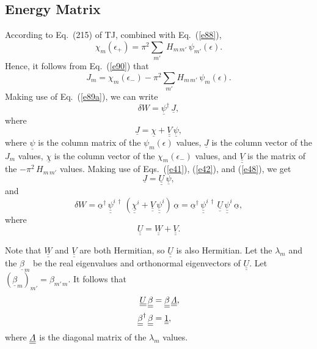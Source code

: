 \documentclass[12pt,prb,aps,notitlepage]{revtex4-1}
\begin{document}
\subsection{Energy Matrix}
According to Eq.~(215) of TJ, combined with Eq.~(\ref{e88}), 
\begin{equation}
\chi_m(\epsilon_+)=\pi^2\sum_{m'}\,H_{m\,m'}\,\psi_{m'}(\epsilon).
\end{equation}
Hence, it follows from Eq.~(\ref{e90}) that
\begin{equation}
J_m = \chi_m(\epsilon_-)-\pi^2\sum_{m'} H_{m\,m'}\,\psi_m(\epsilon).
\end{equation}
Making use of Eq.~(\ref{e89a}), we can write
\begin{equation}
\delta W = \underline{\psi}^\dag\,\underline{J},
\end{equation}
where 
\begin{equation}
\underline{J} = \underline{\chi}+ \underline{\underline{V}}\,\underline{\psi},
\end{equation}
where  $\underline{\psi}$ is the column matrix of the $\psi_m(\epsilon)$ values, $\underline{J}$ is the column vector of the $J_m$ values, $\underline{\chi}$ is the column vector of the $\chi_m(\epsilon_-)$ values,
and $\underline{\underline{V}}$ is the matrix of the $-\pi^2\,H_{m\,m'}$ values. 
Making use of Eqs.~(\ref{e41}), (\ref{e42}), and (\ref{e48}), we get 
\begin{equation}
\underline{J} = \underline{\underline{U}}\,\underline{\psi},
\end{equation}
and
\begin{equation}
\delta W = \underline{\alpha}^\dag\,\underline{\underline{\psi}}^{i\,\dag}\,(\underline{\underline{\chi}}^i + \underline{\underline{V}}\,\underline{\underline{\psi}}^i)\,\underline{\alpha}=  \underline{\alpha}^\dag\,\underline{\underline{\psi}}^{i\,\dag}\,\underline{\underline{U}}\,\underline{\underline{\psi}}^i\,\underline{\alpha},
\end{equation}
where
\begin{equation}
\underline{\underline{U}}=\underline{\underline{W}}+\underline{\underline{V}}.
\end{equation}

Note that $\underline{\underline{W}}$ and $\underline{\underline{V}}$ are both Hermitian, so $\underline{\underline{U}}$ is also
Hermitian. Let 
 the  $\lambda_m$ and the $\underline{\beta}_m$ be the real eigenvalues and orthonormal eigenvectors of $\underline{\underline{U}}$. Let $(\underline{\beta}_m)_{m'} = \beta_{m'\,m}$. It follows that 
 \begin{align}
\underline{\underline{U}}\,\underline{\underline{\beta}}&=\underline{\underline{\beta}}\,\underline{\underline{{\mit\Lambda}}},\\[0.5ex]
\underline{\underline{\beta}}^\dag\,\underline{\underline{\beta}}&= \underline{\underline{1}},\label{e56a}
\end{align}
where $\underline{\underline{\mit\Lambda}}$ is the diagonal matrix of the $\lambda_m$ values. 
\end{document}
